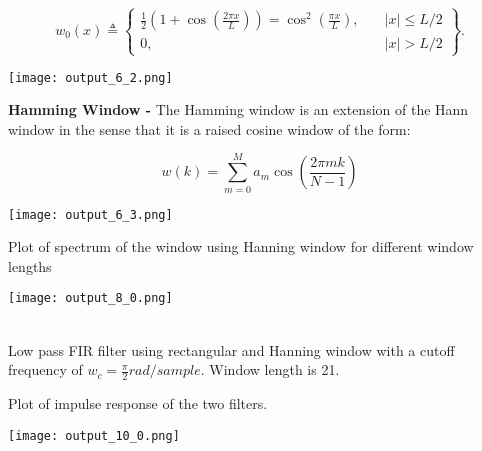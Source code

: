 \documentclass[12pt, a4 paper]{article}
\begin{document}
$${\displaystyle w_{0}(x)\triangleq \left\{{\begin{array}{ccl}{\tfrac {1}{2}}\left(1+\cos \left({\frac {2\pi x}{L}}\right)\right)=\cos ^{2}\left({\frac {\pi x}{L}}\right),\quad &\left|x\right|\leq L/2\\0,\quad &\left|x\right|>L/2\end{array}}\right\}.}$$

\begin{center}
    \begin{wrapfigure}
    \centering
    \texttt{[image: output\_6\_2.png]}
    \end{wrapfigure}
\end{center}

\textbf{Hamming Window - } The Hamming window is an extension of the Hann window in the sense that it is a raised cosine window of the form:

$$w(k)=\sum_{m=0}^{M} a_{m} \cos \left(\frac{2 \pi m k}{N-1}\right)$$

\begin{center}
    \begin{wrapfigure}
    \centering
    \texttt{[image: output\_6\_3.png]}
    \end{wrapfigure}
\end{center}


Plot of spectrum of the window using Hanning window for different window lengths
\solution


\begin{center}
    \begin{wrapfigure}
    \centering
    \texttt{[image: output\_8\_0.png]}
    \end{wrapfigure}
\end{center}

\\

Low pass FIR filter using rectangular and Hanning window with a cutoff frequency of $w_c = \frac{\pi}{2} rad/sample$. Window length is 21.

Plot of impulse response of the two filters.
\solution

\begin{center}
    \begin{wrapfigure}
    \centering
    \texttt{[image: output\_10\_0.png]}
    \end{wrapfigure}
\end{center}
\end{document}
